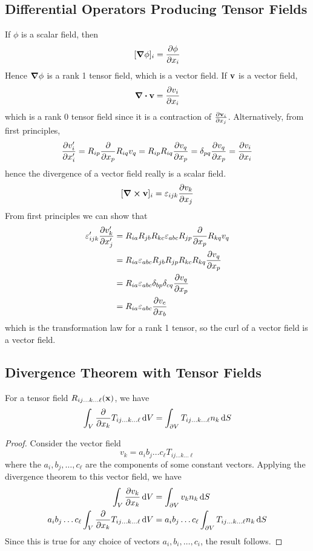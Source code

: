 \documentclass{article}
\begin{document}
\subsection{Differential Operators Producing Tensor Fields}
If $\phi$ is a scalar field, then
\[ [\grad\phi]_i = \pdv{\phi}{x_i} \]
Hence $\grad\phi$ is a rank 1 tensor field, which is a vector field. If $\vb v$ is a vector field,
\[ \div \vb v = \pdv{v_i}{x_i} \]
which is a rank 0 tensor field since it is a contraction of $\pdv{\vb v_i}{x_j}$. Alternatively, from first principles,
\[ \pdv{v_i'}{x_i'} = R_{ip}\pdv{x_p}R_{iq}v_q = R_{ip}R_{iq}\pdv{v_q}{x_p} = \delta_{pq}\pdv{v_q}{x_p} = \pdv{v_i}{x_i} \]
hence the divergence of a vector field really is a scalar field.
\[ [\curl \vb v]_i = \varepsilon_{ijk} \pdv{v_k}{x_j} \]
From first principles we can show that
\begin{align*}
	\varepsilon_{ijk}' \pdv{v_k'}{x_j'} & = R_{ia}R_{jb}R_{kc}\varepsilon_{abc} R_{jp}\pdv{x_p} R_{kq}v_q       \\
	                                    & = R_{ia} \varepsilon_{abc} R_{jb} R_{jp} R_{kc} R_{kq} \pdv{v_q}{x_p} \\
	                                    & = R_{ia} \varepsilon_{abc} \delta_{bp} \delta_{cq} \pdv{v_q}{x_p}     \\
	                                    & = R_{ia} \varepsilon_{abc} \pdv{v_c}{x_b}
\end{align*}
which is the transformation law for a rank 1 tensor, so the curl of a vector field is a vector field.

\subsection{Divergence Theorem with Tensor Fields}
\begin{proposition}
	For a tensor field $R_{ij\dots k \dots \ell}(\vb x)$, we have
	\[ \int_V \pdv{x_k} T_{ij\dots k \dots \ell} \dd{V} = \int_{\partial V} T_{ij\dots k \dots \ell} n_k \dd{S} \]
\end{proposition}
\begin{proof}
	Consider the vector field
	\[ v_k = a_i b_j \dots c_\ell T_{ij\dots k \dots \ell} \]
	where the $a_i, b_j, \dots, c_\ell$ are the components of some constant vectors. Applying the divergence theorem to this vector field, we have
	\begin{align*}
		\int_V \pdv{v_k}{x_k} \dd{V}                                         & = \int_{\partial V} v_k n_k \dd{S}                                          \\
		a_i b_j \dots c_\ell \int_V \pdv{x_k} T_{ij\dots k\dots \ell} \dd{V} & = a_i b_j \dots c_\ell \int_{\partial V} T_{ij\dots k\dots \ell} n_k \dd{S}
	\end{align*}
	Since this is true for any choice of vectors $a_i, b_i, \dots, c_i$, the result follows.
\end{proof}
\end{document}
